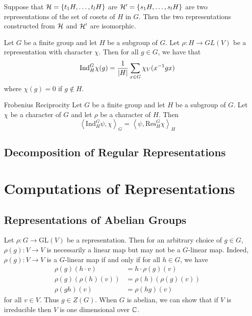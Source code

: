 \documentclass[a4paper]{article}
\begin{document}
\begin{thm}{}{} Suppose that $\mathcal{H}=\{t_1H,\dots,t_lH\}$ are $\mathcal{H}'=\{s_1H,\dots,s_lH\}$ are two representations of the set of cosets of $H$ in $G$. Then the two representations constructed from $\mathcal{H}$ and $\mathcal{H}'$ are isomorphic. 
\end{thm}

\begin{lmm}{}{} Let $G$ be a finite group and let $H$ be a subgroup of $G$. Let $\rho:H\to GL(V)$ be a representation with character $\chi$. Then for all $g\in G$, we have that $$\text{Ind}_H^G\chi(g)=\frac{1}{\abs{H}}\sum_{x\in G}\chi_V(x^{-1}gx)$$ where $\chi(g)=0$ if $g\notin H$. 
\end{lmm}

\begin{thm}{Frobenius Reciprocity}{} Let $G$ be a finite group and let $H$ be a subgroup of $G$. Let $\chi$ be a character of $G$ and let $\rho$ be a character of $H$. Then $$\left\langle\text{Ind}_H^G\psi,\chi\right\rangle_G=\left\langle\psi,\text{Res}_H^G\chi\right\rangle_H$$
\end{thm}

\subsection{Decomposition of Regular Representations}

\pagebreak
\section{Computations of Representations}
\subsection{Representations of Abelian Groups}
Let $\rho:G\to\text{GL}(V)$ be a representation. Then for an arbitrary choice of $g\in G$, $\rho(g):V\to V$ is necessarily a linear map but may not be a $G$-linear map. Indeed, $\rho(g):V\to V$ is a $G$-linear map if and only if for all $h\in G$, we have 
\begin{align*}
\rho(g)(h\cdot v)&=h\cdot\rho(g)(v)\\
\rho(g)(\rho(h)(v))&=\rho(h)(\rho(g)(v))\\
\rho(gh)(v)&=\rho(hg)(v)
\end{align*}
for all $v\in V$. Thus $g\in Z(G)$. When $G$ is abelian, we can show that if $V$ is irreducible then $V$ is one dimensional over $\mathbb{C}$. 
\end{document}

